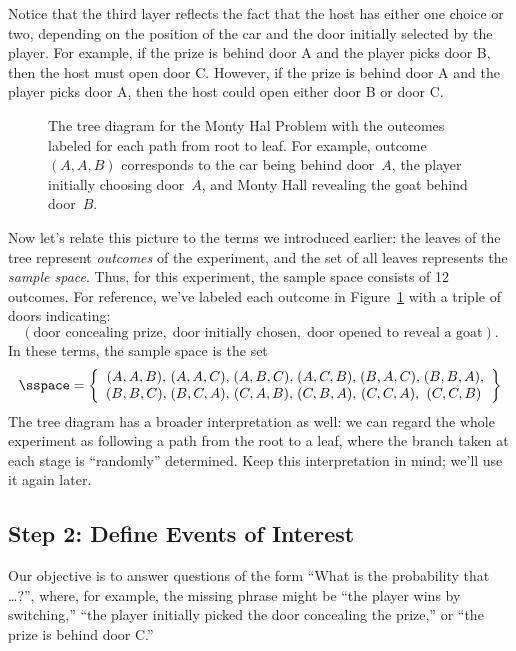 Notice that the third layer reflects the fact that the host has either one
choice or two, depending on the position of the car and the door initially
selected by the player.  For example, if the prize is behind door A and
the player picks door B, then the host must open door C.  However, if the
prize is behind door A and the player picks door A, then the host could
open either door B or door C.

\begin{figure}


\caption{The tree diagram for the Monty Hal Problem with the outcomes
  labeled for each path from root to leaf.  For example, outcome $(A,
  A, B)$ corresponds to the car being behind door~$A$, the player
  initially choosing door~$A$, and Monty Hall revealing the goat
  behind door~$B$.}

\label{fig:14A3}

\end{figure}

Now let's relate this picture to the terms we introduced earlier: the
leaves of the tree represent \emph{outcomes} of the experiment, and
the set of all leaves represents the \emph{sample space}.  Thus, for
this experiment, the sample space consists of 12 outcomes.  For
reference, we've labeled each outcome in Figure~\ref{fig:14A3} with a
triple of doors indicating:
%
\[
    (\text{door concealing prize}, \;
    \text{door initially chosen}, \;
     \text{door opened to reveal a goat}).
\]
%
In these terms, the sample space is the set
%
\[
\sspace = \left\{
\begin{array}{c@{\;}c@{\;}c@{\;}c@{\;}c@{\;}c}
(A, A, B), & (A, A, C), & (A, B, C), & (A, C, B), & (B, A, C), & (B, B, A), \\
(B, B, C), & (B, C, A), & (C, A, B), & (C, B, A), & (C, C, A), & (C, C, B)
\end{array}
\right\}
\]
%
The tree diagram has a broader interpretation as well: we can regard the
whole experiment as following a path from the root to a leaf, where the
branch taken at each stage is ``randomly'' determined.  Keep this
interpretation in mind; we'll use it again later.

\subsection{Step 2: Define Events of Interest}

Our objective is to answer questions of the form ``What is the
probability that \dots ?'', where, for example, the missing phrase
might be ``the player wins by switching,'' ``the player initially
picked the door concealing the prize,'' or ``the prize is behind door
C.''

